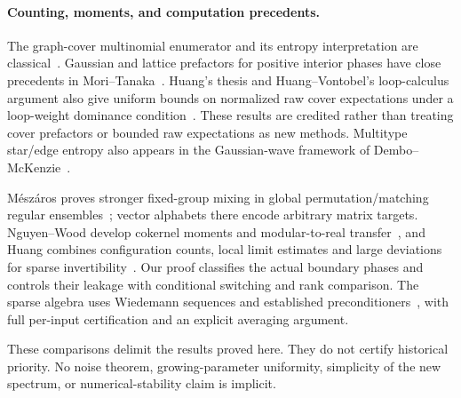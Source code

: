 \paragraph{Counting, moments, and computation precedents.}
The graph-cover multinomial enumerator and its entropy interpretation
are classical~\cite{Vontobel}. Gaussian and lattice prefactors for
positive interior phases have close precedents in
Mori--Tanaka~\cite{MoriTanaka,MoriTanakaCentral}.
Huang's thesis and Huang--Vontobel's loop-calculus argument also give
uniform bounds on normalized raw cover expectations under a loop-weight dominance
condition~\cite{HuangThesis,HV}.
These results are credited rather than treating cover prefactors or
bounded raw expectations as new methods. Multitype star/edge entropy
also appears in the Gaussian-wave framework of
Dembo--McKenzie~\cite{DM}.

M\'esz\'aros proves stronger fixed-group mixing in global
permutation/matching regular ensembles~\cite{Meszaros}; vector
alphabets there encode arbitrary matrix targets.
Nguyen--Wood develop cokernel moments and modular-to-real
transfer~\cite{NW}, and Huang combines configuration counts, local
limit estimates and large deviations for sparse
invertibility~\cite{Huang}. Our proof classifies the actual boundary
phases and controls their leakage with conditional switching and
rank comparison. The sparse algebra uses Wiedemann sequences and
established preconditioners~\cite{Wiedemann,Chen}, with full per-input
certification and an explicit averaging argument.

These comparisons delimit the results proved here. They do not
certify historical priority. No noise theorem, growing-parameter
uniformity, simplicity of the new spectrum, or numerical-stability
claim is implicit.

